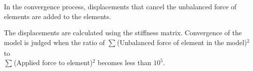 In the convergence process, displacements that cancel the unbalanced force of elements are added to the elements.

The displacements are calculated using the stiffness matrix. Convergence of the model is judged when the ratio of
$\sum_{} $(Unbalanced force of element in the model)$^2$ to \\
$\sum_{} $(Applied force to element)$^2$ becomes less than $10^5$.



%
%
%
%
%
%
%
%
%
%
%
